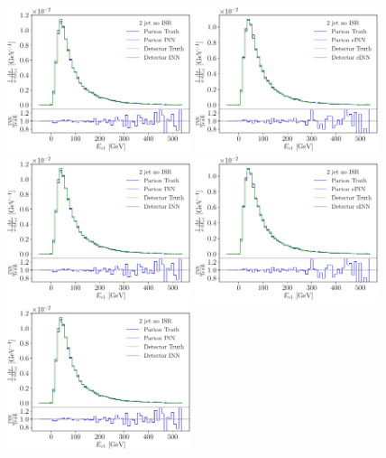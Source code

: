 \begin{figure}[t]
\includegraphics[page=25, width=0.48\textwidth]{figures/cINN/INN_noE}
\includegraphics[page=25, width=0.48\textwidth]{figures/cINN/INN_FineTune} \\
\includegraphics[page=26, width=0.48\textwidth]{figures/cINN/INN_noE}
\includegraphics[page=26, width=0.48\textwidth]{figures/cINN/INN_FineTune} \\
\includegraphics[page=32, width=0.48\textwidth]{figures/cINN/INN_noE}

\end{figure}
